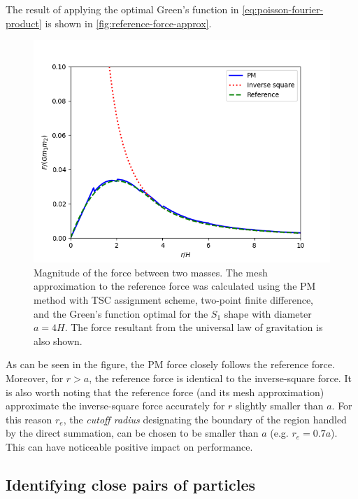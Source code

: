 The result of applying the optimal Green's function in \autoref{eq:poisson-fourier-product} is shown in \autoref{fig:reference-force-approx}.
\begin{figure}[htp]
    \centering
    \includegraphics[scale=0.6]{img/optimal-green-force-4.png}
    \caption{Magnitude of the force between two masses.
        The mesh approximation to the reference force was calculated using the PM method with TSC assignment scheme, two-point finite difference, and the Green's function optimal for the $S_1$ shape with diameter $a=4H$.
        The force resultant from the universal law of gravitation is also shown.}
    \label{fig:reference-force-approx}
\end{figure}
As can be seen in the figure, the PM force closely follows the reference force.
Moreover, for $r>a$, the reference force is identical to the inverse-square force.
It is also worth noting that the reference force (and its mesh approximation) approximate the inverse-square force accurately for $r$ slightly smaller than $a$.
For this reason $r_e$, the \textit{cutoff radius} designating the boundary of the region handled by the direct summation, can be chosen to be smaller than $a$ (e.g. $r_e = 0.7a$).
This can have noticeable positive impact on performance.

\subsection{Identifying close pairs of particles}
